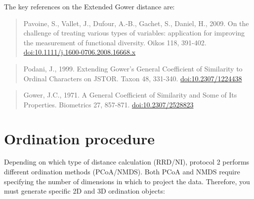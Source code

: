 \documentclass[12pt,]{book}
\begin{document}
The key references on the Extended Gower distance are:

\begin{quote}
Pavoine, S., Vallet, J., Dufour, A.-B., Gachet, S., Daniel, H., 2009. On the challenge of treating various types of variables: application for improving the measurement of functional diversity. Oikos 118, 391-402. \url{doi:10.1111/j.1600-0706.2008.16668.x}
\end{quote}

\begin{quote}
Podani, J., 1999. Extending Gower's General Coefficient of Similarity to Ordinal Characters on JSTOR. Taxon 48, 331-340. \url{doi:10.2307/1224438}
\end{quote}

\begin{quote}
Gower, J.C., 1971. A General Coefficient of Similarity and Some of Its Properties. Biometrics 27, 857-871. \url{doi:10.2307/2528823}
\end{quote}

\pagebreak

\hypertarget{ordination-procedure-1}{%
\section{Ordination procedure}\label{ordination-procedure-1}}

Depending on which type of distance calculation (RRD/NI), protocol 2 performs different ordination methods (PCoA/NMDS). Both PCoA and NMDS require specifying the number of dimensions in which to project the data. Therefore, you must generate specific 2D and 3D ordination objects:
\end{document}
